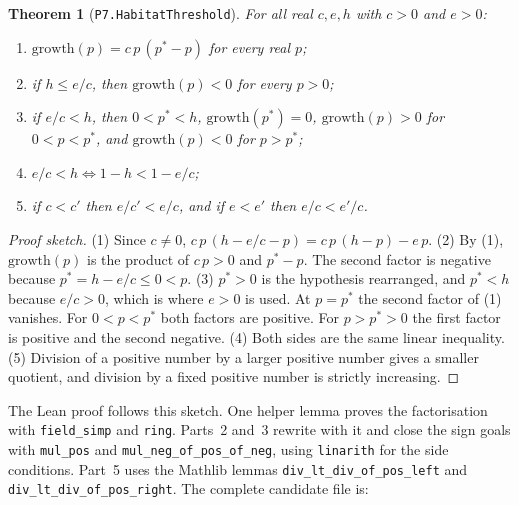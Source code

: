 \documentclass[11pt]{article}
\newtheorem{theorem}{Theorem}
\begin{document}
\begin{theorem}[\texttt{P7.HabitatThreshold}]
For all real $c,e,h$ with $c>0$ and $e>0$:
\begin{enumerate}
\item $\mathrm{growth}(p)=c\,p\,(p^*-p)$ for every real $p$;
\item if $h\le e/c$, then $\mathrm{growth}(p)<0$ for every $p>0$;
\item if $e/c<h$, then $0<p^*<h$, $\mathrm{growth}(p^*)=0$, $\mathrm{growth}(p)>0$ for
$0<p<p^*$, and $\mathrm{growth}(p)<0$ for $p>p^*$;
\item $e/c<h \iff 1-h<1-e/c$;
\item if $c<c'$ then $e/c'<e/c$, and if $e<e'$ then $e/c<e'/c$.
\end{enumerate}
\end{theorem}

\begin{proof}[Proof sketch]
(1) Since $c\neq0$, $c\,p\,(h-e/c-p)=c\,p\,(h-p)-e\,p$. (2) By (1), $\mathrm{growth}(p)$ is the
product of $c\,p>0$ and $p^*-p$. The second factor is negative because $p^*=h-e/c\le0<p$.
(3) $p^*>0$ is the hypothesis rearranged, and $p^*<h$ because $e/c>0$, which is where $e>0$ is
used. At $p=p^*$ the second factor of (1) vanishes. For $0<p<p^*$ both factors are positive. For
$p>p^*>0$ the first factor is positive and the second negative. (4) Both sides are the same linear
inequality. (5) Division of a positive number by a larger positive number gives a smaller
quotient, and division by a fixed positive number is strictly increasing.
\end{proof}

The Lean proof follows this sketch. One helper lemma proves the factorisation with
\texttt{field\_simp} and \texttt{ring}. Parts~2 and~3 rewrite with it and close the sign goals with
\texttt{mul\_pos} and \texttt{mul\_neg\_of\_pos\_of\_neg}, using \texttt{linarith} for the
side conditions. Part~5 uses the Mathlib lemmas \texttt{div\_lt\_div\_of\_pos\_left} and
\texttt{div\_lt\_div\_of\_pos\_right}. The complete candidate file is:
\end{document}
